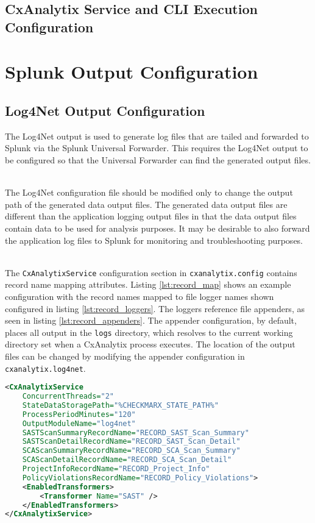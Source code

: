 \subsection{CxAnalytix Service and CLI Execution Configuration}


\section{Splunk Output Configuration}\label{sec:splunk_config}
\subsection{Log4Net Output Configuration}

The Log4Net output is used to generate log files that are tailed and forwarded to Splunk via the Splunk Universal Forwarder.  This requires the Log4Net
output to be configured so that the Universal Forwarder can find the generated output files.

\noindent\\The Log4Net configuration file should be modified only to change the output path of the generated data output files.  The generated data output files are different
than the application logging output files in that the data output files contain data to be used for analysis purposes. It may be desirable to also forward
the application log files to Splunk for monitoring and troubleshooting purposes.

\noindent\\The \texttt{CxAnalytixService} configuration section in \texttt{cxanalytix.config} contains record name mapping attributes.  Listing \ref{lst:record_map}
shows an example configuration with the record names mapped to file logger names shown configured in listing \ref{lst:record_loggers}.  The loggers
reference file appenders, as seen in listing \ref{lst:record_appenders}.  The appender configuration, by default, places all output in the \texttt{logs}
directory, which resolves to the current working directory set when a CxAnalytix process executes.  The location of the output files can be changed
by modifying the appender configuration in \texttt{cxanalytix.log4net}.


\begin{lstlisting}[caption={Example Record Map Configuration}, label={lst:record_map}, language=XML]
<CxAnalytixService 
    ConcurrentThreads="2" 
    StateDataStoragePath="%CHECKMARX_STATE_PATH%"
    ProcessPeriodMinutes="120"
    OutputModuleName="log4net"
    SASTScanSummaryRecordName="RECORD_SAST_Scan_Summary"
    SASTScanDetailRecordName="RECORD_SAST_Scan_Detail"
    SCAScanSummaryRecordName="RECORD_SCA_Scan_Summary"
    SCAScanDetailRecordName="RECORD_SCA_Scan_Detail"
    ProjectInfoRecordName="RECORD_Project_Info"
    PolicyViolationsRecordName="RECORD_Policy_Violations">
    <EnabledTransformers>
        <Transformer Name="SAST" />
    </EnabledTransformers>
</CxAnalytixService>
\end{lstlisting}

